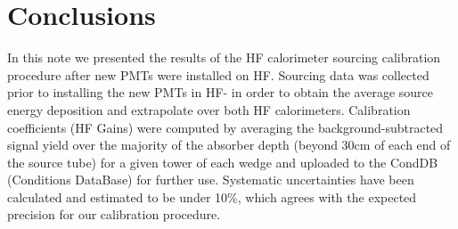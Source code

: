 \section{Conclusions}
In this note we presented the results of the HF calorimeter sourcing calibration
procedure after new PMTs were installed on HF. Sourcing data was collected prior
to installing the new PMTs in HF- in order to obtain the average source energy
deposition and extrapolate over both HF calorimeters. Calibration coefficients
(HF Gains) were computed by averaging the background-subtracted signal yield
over the majority of the absorber depth (beyond 30cm of each end of the source
tube) for a given tower of each wedge and uploaded to the CondDB (Conditions
DataBase) for further use. Systematic uncertainties have been calculated and
estimated to be under 10\%, which agrees with the expected precision for our
calibration procedure.
